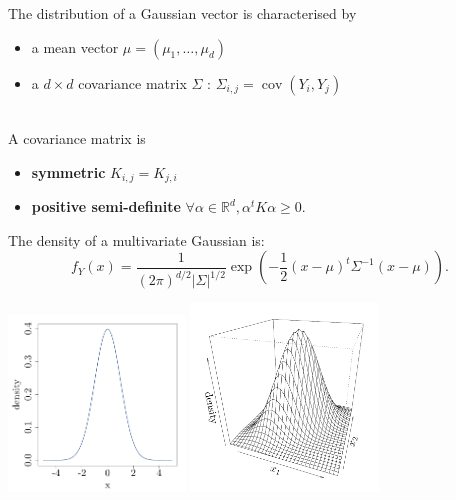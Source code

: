 \documentclass{beamer}
\DeclareMathOperator*{\Cov}{cov}
\begin{document}
\begin{frame}{}
The distribution of a Gaussian vector is characterised by
\begin{itemize}
 	\item a mean vector $\mu = (\mu_1, \dots, \mu_d)$
 	\item a $d \times d$ covariance matrix $\Sigma$ : $\Sigma_{i,j}=\Cov(Y_i, Y_j)$
\end{itemize} 
\vspace{5mm}
\\
A covariance matrix is 
\begin{itemize}
	\item \textbf{symmetric} $K_{i,j}=K_{j,i}$
	\item \textbf{positive semi-definite} $\forall \alpha \in \mathds{R}^d, \alpha^t K \alpha \geq 0$.
\end{itemize} 
\end{frame}

\begin{frame}{}
The density of a multivariate Gaussian is:
\begin{equation*}
f_Y(x) = \frac{1}{\displaystyle (2 \pi)^{d/2} |\Sigma|^{1/2}} \exp \left(-\frac12 (x-\mu)^t \Sigma^{-1} (x-\mu)  \right).
\end{equation*} 
\begin{center}
 \includegraphics[height=4.7cm]{figures/R/MVN_dens1} \qquad \includegraphics[height=5cm]{figures/R/MVN_dens2} 
\end{center}
\end{frame}
\end{document}
